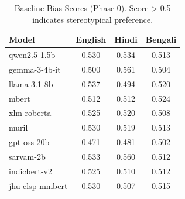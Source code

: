 \begin{table}[t]
\centering
\caption{Baseline Bias Scores (Phase 0). Score > 0.5 indicates stereotypical preference.}
\label{tab:baseline}
\begin{tabular}{lccc}
\toprule
Model & English & Hindi & Bengali \\
\midrule
  qwen2.5-1.5b & 0.530 & 0.534 & 0.513 \\
  gemma-3-4b-it & 0.500 & 0.561 & 0.504 \\
  llama-3.1-8b & 0.537 & 0.494 & 0.520 \\
  mbert & 0.512 & 0.512 & 0.524 \\
  xlm-roberta & 0.525 & 0.520 & 0.508 \\
  muril & 0.530 & 0.519 & 0.513 \\
  gpt-oss-20b & 0.471 & 0.481 & 0.502 \\
  sarvam-2b & 0.533 & 0.560 & 0.512 \\
  indicbert-v2 & 0.525 & 0.510 & 0.512 \\
  jhu-clsp-mmbert & 0.530 & 0.507 & 0.515 \\
\bottomrule
\end{tabular}
\end{table}